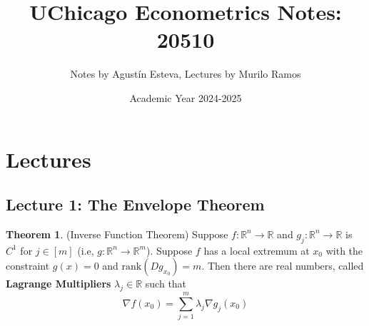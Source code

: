 \documentclass[10pt, oneside]{article}
\title{UChicago Econometrics Notes: 20510}
\author{Notes by Agustín Esteva, Lectures by Murilo Ramos}
\date{Academic Year 2024-2025}
\newcommand{\bbR}{\mathbb{R}}
\theoremstyle{definition}
\newtheorem{thm}{Theorem}
\begin{document}
\maketitle
\tableofcontents

\vspace{.25in}


\newpage
\section{Lectures}

\subsection*{Lecture 1: The Envelope Theorem}
\begin{thm} (Inverse Function Theorem)
    Suppose $f: \bbR^n \to \bbR$ and $g_j: \bbR^n \to \bbR$ is $C^1$ for $j \in [m]$ (i.e, $g: \bbR^n \to \bbR^m$). Suppose $f$ has a local extremum at $x_0$ with the constraint $g(x) =0$ and $\text{rank}(Dg_{x_0}) = m.$ Then there are real numbers, called \textbf{Lagrange Multipliers} $\lambda_j \in \bbR$ such that 
    \[\nabla f(x_0) = \sum_{j=1}^m \lambda_j \nabla g_j(x_0)\]
\end{thm}
\end{document}
